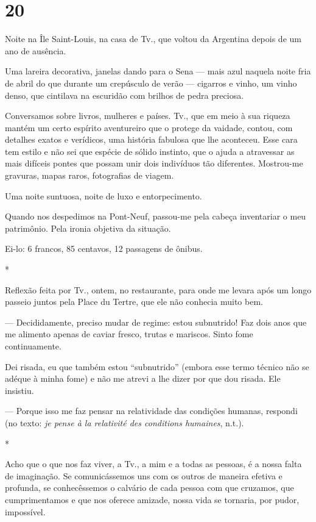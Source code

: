 \section{20}

Noite na Île Saint-Louis, na casa de Tv., que voltou da Argentina depois
de um ano de ausência.

Uma lareira decorativa, janelas dando para o Sena --- mais azul naquela
noite fria de abril do que durante um crepúsculo de verão --- cigarros e
vinho, um vinho denso, que cintilava na escuridão com brilhos de pedra
preciosa.

Conversamos sobre livros, mulheres e países. Tv., que em meio à sua
riqueza mantém um certo espírito aventureiro que o protege da vaidade,
contou, com detalhes exatos e verídicos, uma história fabulosa que lhe
aconteceu. Esse cara tem estilo e não sei que espécie de sólido
instinto, que o ajuda a atravessar as mais difíceis pontes que possam
unir dois indivíduos tão diferentes. Mostrou-me gravuras, mapas raros,
fotografias de viagem.

Uma noite suntuosa, noite de luxo e entorpecimento.

Quando nos despedimos na Pont-Neuf, passou-me pela cabeça inventariar o
meu patrimônio. Pela ironia objetiva da situação.

Ei-lo: 6 francos, 85 centavos, 12 passagens de ônibus.

*

Reflexão feita por Tv., ontem, no restaurante, para onde me levara após
um longo passeio juntos pela Place du Tertre, que ele não conhecia muito
bem.

--- Decididamente, preciso mudar de regime: estou subnutrido! Faz dois anos que me alimento apenas de caviar fresco, trutas e mariscos. Sinto fome continuamente.

Dei risada, eu que também estou ``subnutrido'' (embora esse termo
técnico não se adéque à minha fome) e não me atrevi a lhe dizer por que
dou risada. Ele insistiu.

--- Porque isso me faz pensar na relatividade das condições humanas, respondi (no texto: \emph{je pense à la relativité des conditions humaines}, n.t.).

*

Acho que o que nos faz viver, a Tv., a mim e a todas as pessoas, é a
nossa falta de imaginação. Se comunicássemos uns com os outros de
maneira efetiva e profunda, se conhecêssemos o calvário de cada pessoa
com que cruzamos, que cumprimentamos e que nos oferece amizade, nossa
vida se tornaria, por pudor, impossível.

